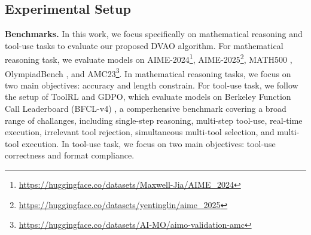 \documentclass{llmxive}
\begin{document}
\subsection{Experimental Setup}
\textbf{Benchmarks.} In this work, we focus specifically on mathematical reasoning and tool-use tasks to evaluate our proposed DVAO algorithm. For mathematical reasoning task, we evaluate models on AIME-2024\footnote{\url{https://huggingface.co/datasets/Maxwell-Jia/AIME_2024}}, AIME-2025\footnote{\url{https://huggingface.co/datasets/yentinglin/aime_2025}}, MATH500 \citep{math500}, OlympiadBench \citep{olympiadbench}, and AMC23\footnote{\url{https://huggingface.co/datasets/AI-MO/aimo-validation-amc}}. In mathematical reasoning tasks, we focus on two main objectives: accuracy and length constrain. For tool-use task, we follow the setup of ToolRL \citep{toolrl} and GDPO, which evaluate models on Berkeley Function Call Leaderboard (BFCL-v4) \citep{bfcl}, a comperhensive benchmark covering a broad range of challanges, including single-step reasoning, multi-step tool-use, real-time execution, irrelevant tool rejection, simultaneous multi-tool selection, and multi-tool execution. In tool-use task, we focus on two main objectives: tool-use correctness and format compliance.
\end{document}
